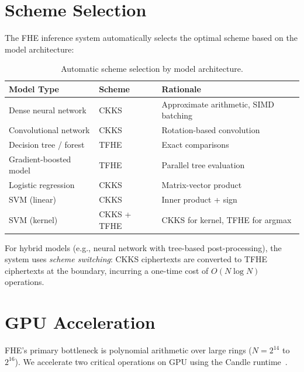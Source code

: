 \documentclass[11pt]{article}
\begin{document}
\section{Scheme Selection}
\label{sec:schemes}

The FHE inference system automatically selects the optimal scheme based on the
model architecture:

\begin{table}[H]
\centering
\small
\begin{tabular}{lll}
\toprule
\textbf{Model Type} & \textbf{Scheme} & \textbf{Rationale} \\
\midrule
Dense neural network & CKKS & Approximate arithmetic, SIMD batching \\
Convolutional network & CKKS & Rotation-based convolution \\
Decision tree / forest & TFHE & Exact comparisons \\
Gradient-boosted model & TFHE & Parallel tree evaluation \\
Logistic regression & CKKS & Matrix-vector product \\
SVM (linear) & CKKS & Inner product + sign \\
SVM (kernel) & CKKS + TFHE & CKKS for kernel, TFHE for argmax \\
\bottomrule
\end{tabular}
\caption{Automatic scheme selection by model architecture.}
\label{tab:scheme}
\end{table}

For hybrid models (e.g., neural network with tree-based post-processing), the
system uses \emph{scheme switching}: CKKS ciphertexts are converted to TFHE
ciphertexts at the boundary, incurring a one-time cost of $O(N \log N)$
operations.

\section{GPU Acceleration}
\label{sec:gpu}

FHE's primary bottleneck is polynomial arithmetic over large rings
($N = 2^{14}$ to $2^{16}$). We accelerate two critical operations on GPU using
the Candle runtime~\cite{hanzocandle}.
\end{document}
